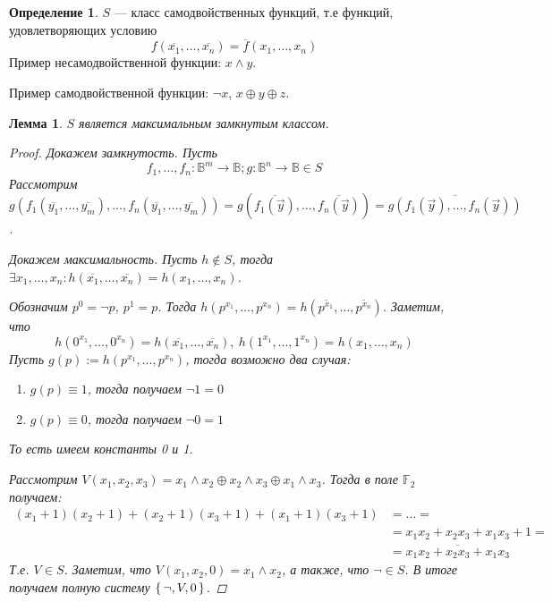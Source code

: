 \documentclass[12pt]{article}
\let\eq\equiv
\let\la\land
\let\n\neg
\let\nin\notin
\theoremstyle{definition}
\newtheorem{definition}{Определение}[section]
\theoremstyle{plain}
\newtheorem{lemma}{Лемма}[section]
\theoremstyle{remark}
\begin{document}
\begin{definition}
  $S$ --- класс самодвойственных функций, т.е функций, удовлетворяющих условию
  \begin{displaymath}
    f(\overline{x_1}, \dots, \overline{x_n}) = \overline{f}(x_1, \dots, x_n)
  \end{displaymath}
  Пример несамодвойственной функции: $x \la y$.

  Пример самодвойственной функции: $\n x$, $x \oplus y \oplus z$.
\end{definition}
\begin{lemma}
  $S$ является максимальным замкнутым классом.
  \begin{proof}
    Докажем замкнутость. Пусть
    \begin{displaymath}
      f_1, \dots, f_n \colon \mathbb{B}^m \to \mathbb{B}; g \colon
      \mathbb{B}^n \to \mathbb{B} \in S
    \end{displaymath}
    Рассмотрим $g(f_1(\overline{y_1}, \dots, \overline{y_m}), \dots,
    f_n(\overline{y_1}, \dots, \overline{y_m})) =
    g(\overline{f_1(\vec{y})}, \dots, \overline{f_n(\vec{y})}) =
    \overline{g(f_1(\vec{y}), \dots, f_n(\vec{y}))}$.

    Докажем максимальность. Пусть $h \nin S$, тогда $\exists x_1,
    \dots, x_n \colon h(\overline{x_1}, \dots, \overline{x_n}) =
    h(x_1, \dots, x_n)$.

    Обозначим $p^0 = \n p$, $p^1 = p$. Тогда $h(p^{x_1}, \dots,
    p^{x_n}) = h(\overline{p^{x_1}}, \dots, \overline{p^{x_n}})$. Заметим, что
    \begin{displaymath}
      h(0^{x_1}, \dots, 0^{x_n}) = h(\overline{x_1}, \dots,
      \overline{x_n}),\ h(1^{x_1}, \dots, 1^{x_n}) = h(x_1, \dots, x_n)
    \end{displaymath}
    Пусть $g(p) := h(p^{x_1}, \dots, p^{x_n})$, тогда возможно два случая:
    \begin{enumerate}
      \item $g(p) \eq 1$, тогда получаем $\n 1 = 0$

      \item $g(p) \eq 0$, тогда получаем $\n 0 = 1$
    \end{enumerate}
    То есть имеем константы 0 и 1.

    Рассмотрим $V(x_1, x_2, x_3) = x_1 \la x_2 \oplus x_2 \la x_3
    \oplus x_1 \la x_3$. Тогда в поле $\mathbb{F}_2$ получаем:
    \begin{align*}
      (x_1 + 1)(x_2 + 1) + (x_2 + 1)(x_3 + 1) + (x_1 + 1)(x_3 + 1) &=
      \dots =\\&=
      x_1x_2 + x_2x_3 + x_1x_3 + 1 =\\&= \overline{x_1x_2 + x_2x_3 + x_1x_3}
    \end{align*}
    Т.е. $V \in S$. Заметим, что $V(x_1, x_2, 0) = x_1 \land x_2$, а
    также, что $\n \in S$. В итоге получаем полную систему $\set{\n, V, 0}$.
  \end{proof}
\end{lemma}
\end{document}
